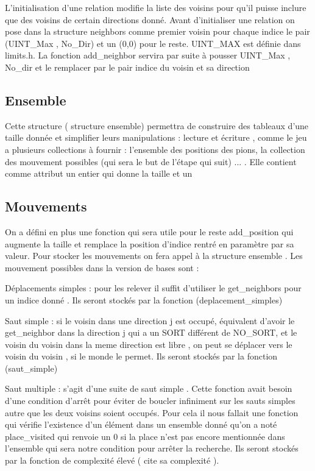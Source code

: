 \documentclass[a4paper]{article}
\begin{document}
L’initialisation d’une relation modifie la liste des voisins pour qu’il puisse inclure que des voisins de certain directions donné. Avant d’initialiser une relation on pose dans la structure neighbors comme premier voisin pour chaque indice le pair (UINT\_Max , No\_Dir) et un (0,0) pour le reste. UINT\_MAX est définie dans limits.h. La fonction add\_neighbor servira par suite à pousser UINT\_Max , No\_dir et le remplacer par le pair indice du voisin et sa direction 
\subsection{Ensemble}
Cette structure ( structure ensemble)  permettra de construire des tableaux d’une taille donnée et simplifier leurs manipulations : lecture et écriture , comme le jeu a plusieurs collections à fournir : l’ensemble des positions des pions, la collection des mouvement possibles (qui sera le but de l’étape qui suit) ... . Elle contient comme attribut un entier qui donne la taille et un  
\subsection{Mouvements}
On a défini en plus une fonction qui sera utile pour le reste add\_position qui augmente la taille et remplace la position d’indice rentré en paramètre par sa valeur. 
Pour stocker les mouvements on fera appel à la structure ensemble . Les mouvement possibles dans la version de bases sont :  

    Déplacements simples : pour les relever il suffit d’utiliser le get\_neighbors pour un indice donné . Ils seront stockés par la fonction (deplacement\_simples) 

    Saut simple : si le voisin dans une direction j est occupé, équivalent d’avoir le get\_neighbor dans la direction j qui a un SORT différent de NO\_SORT, et le voisin du voisin dans la meme direction est libre ,  on peut se déplacer vers le voisin du voisin , si le monde le permet. Ils seront stockés par la fonction (saut\_simple) 

    Saut multiple : s’agit d’une suite de saut simple . Cette fonction avait besoin d’une condition d’arrêt pour éviter de boucler infiniment sur les sauts simples autre que les deux voisins soient occupés. Pour cela il nous fallait une fonction qui vérifie l’existence d’un élément dans un ensemble donné qu’on a noté place\_visited qui renvoie un 0 si la place n’est pas encore mentionnée dans l’ensemble qui sera notre condition pour arrêter la recherche. Ils seront stockés par la fonction de complexité élevé ( cite sa complexité ). 
\end{document}
